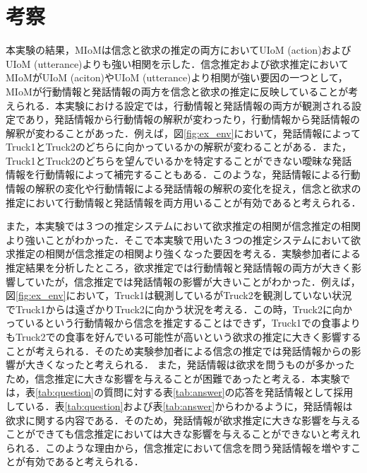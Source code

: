 \chapter{考察}
\par
本実験の結果，MIoMは信念と欲求の推定の両方においてUIoM (action)およびUIoM (utterance)よりも強い相関を示した．信念推定および欲求推定においてMIoMがUIoM (aciton)やUIoM (utterance)より相関が強い要因の一つとして，MIoMが行動情報と発話情報の両方を信念と欲求の推定に反映していることが考えられる．本実験における設定では，行動情報と発話情報の両方が観測される設定であり，発話情報から行動情報の解釈が変わったり，行動情報から発話情報の解釈が変わることがあった．例えば，図\ref{fig:ex_env}において，発話情報によってTruck1とTruck2のどちらに向かっているかの解釈が変わることがある．また，Truck1とTruck2のどちらを望んでいるかを特定することができない曖昧な発話情報を行動情報によって補完することもある．このような，発話情報による行動情報の解釈の変化や行動情報による発話情報の解釈の変化を捉え，信念と欲求の推定において行動情報と発話情報を両方用いることが有効であると考えられる．

\par
また，本実験では３つの推定システムにおいて欲求推定の相関が信念推定の相関より強いことがわかった．そこで本実験で用いた３つの推定システムにおいて欲求推定の相関が信念推定の相関より強くなった要因を考える．実験参加者による推定結果を分析したところ，欲求推定では行動情報と発話情報の両方が大きく影響していたが，信念推定では発話情報の影響が大きいことがわかった．例えば，図\ref{fig:ex_env}において，Truck1は観測しているがTruck2を観測していない状況でTruck1からは遠ざかりTruck2に向かう状況を考える．この時，Truck2に向かっているという行動情報から信念を推定することはできず，Truck1での食事よりもTruck2での食事を好んでいる可能性が高いという欲求の推定に大きく影響することが考えられる．そのため実験参加者による信念の推定では発話情報からの影響が大きくなったと考えられる．
また，発話情報は欲求を問うものが多かったため，信念推定に大きな影響を与えることが困難であったと考える．本実験では，表\ref{tab:question}の質問に対する表\ref{tab:answer}の応答を発話情報として採用している．表\ref{tab:question}および表\ref{tab:answer}からわかるように，発話情報は欲求に関する内容である．そのため，発話情報が欲求推定に大きな影響を与えることができても信念推定においては大きな影響を与えることができないと考えれられる．このような理由から，信念推定において信念を問う発話情報を増やすことが有効であると考えられる．
